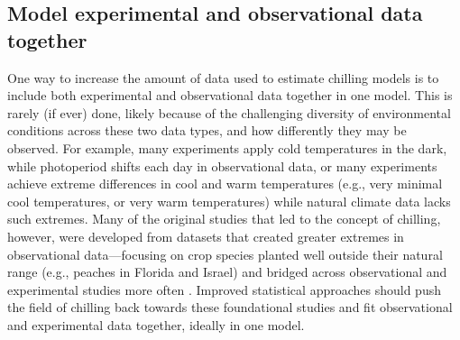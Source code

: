 \documentclass[11pt]{article}
\begin{document}
\subsection*{Model experimental and observational data together} 
One way to increase the amount of data used to estimate chilling models is to include both experimental and observational data together in one model. This is rarely (if ever) done, likely because of the challenging diversity of environmental conditions across these two data types, and how differently they may be observed. 
For example, many experiments apply cold temperatures in the dark, while photoperiod shifts each day in observational data, or many experiments achieve extreme differences in cool and warm temperatures (e.g., very minimal cool temperatures, or very warm temperatures) while natural climate data lacks such extremes. Many of the original studies that led to the concept of chilling, however, were developed from datasets that created greater extremes in observational data---focusing on crop species planted well outside their natural range (e.g., peaches in Florida and Israel) and bridged across observational and experimental studies more often \citep{erez1971,richardson1974}. Improved statistical approaches should push the field of chilling back towards these foundational studies and fit observational and experimental data together, ideally in one model. 
\end{document}
